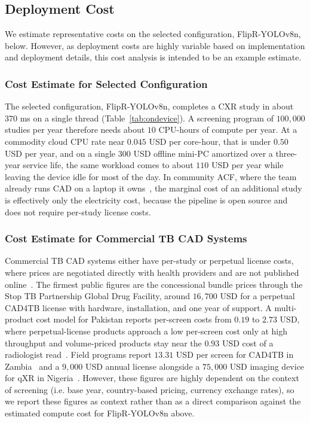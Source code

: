\documentclass[conference, letterpaper]{IEEEtran}
\begin{document}
\subsection{Deployment Cost}

We estimate representative costs on the selected configuration, FlipR-YOLOv8n, below. However, as deployment costs are highly variable based on implementation and deployment details, this cost analysis is intended to be an example estimate.

\subsubsection{Cost Estimate for Selected Configuration}

The selected configuration, FlipR-YOLOv8n, completes a CXR study in about $370$ ms on a single thread (Table~\ref{tab:ondevice}). A screening program of $100{,}000$ studies per year therefore needs about $10$ CPU-hours of compute per year. At a commodity cloud CPU rate near $0.045$ USD per core-hour, that is under $0.50$ USD per year, and on a single $300$ USD offline mini-PC amortized over a three-year service life, the same workload comes to about $110$ USD per year while leaving the device idle for most of the day. In community ACF, where the team already runs CAD on a laptop it owns~\cite{stoptb_cad_guide}, the marginal cost of an additional study is effectively only the electricity cost, because the pipeline is open source and does not require per-study license costs.

\subsubsection{Cost Estimate for Commercial TB CAD Systems}

Commercial TB CAD systems either have per-study or perpetual license costs, where prices are negotiated directly with health providers and are not published online~\cite{bashir2022economic}. The firmest public figures are the concessional bundle prices through the Stop TB Partnership Global Drug Facility, around $16{,}700$ USD for a perpetual CAD4TB license with hardware, installation, and one year of support. A multi-product cost model for Pakistan reports per-screen costs from $0.19$ to $2.73$ USD, where perpetual-license products approach a low per-screen cost only at high throughput and volume-priced products stay near the $0.93$ USD cost of a radiologist read~\cite{bashir2022economic}. Field programs report $13.31$ USD per screen for CAD4TB in Zambia~\cite{jo2021cad4tb} and a $9{,}000$ USD annual license alongside a $75{,}000$ USD imaging device for qXR in Nigeria~\cite{garg2025qxr}. However, these figures are highly dependent on the context of screening (i.e. base year, country-based pricing, currency exchange rates), so we report these figures as context rather than as a direct comparison against the estimated compute cost for FlipR-YOLOv8n above.
\end{document}
